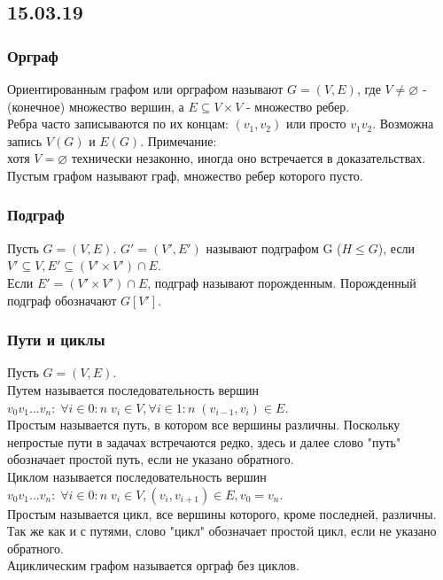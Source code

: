 \subsection{15.03.19}
\subsubsection{Орграф}
Ориентированным графом или орграфом называют $G = (V, E)$, где $V \not= \varnothing$ - (конечное) множество вершин, а $E \subseteq V \times V$ - множество ребер.\\
Ребра часто записываются по их концам: $(v_1, v_2)$ или просто $v_1v_2$.
Возможна запись $V(G)$ и $E(G)$.
Примечание: \\
хотя $V = \varnothing$ технически незаконно, иногда оно встречается в доказательствах.\\
Пустым графом называют граф, множество ребер которого пусто.\\
\subsubsection{Подграф}
Пусть $G = (V, E)$. $G' = (V', E')$ называют подграфом G ($H \leq G$), если $V' \subseteq V, E' \subseteq (V' \times V') \cap E$.\\
Если $E' = (V' \times V') \cap E$, подграф называют порожденным. Порожденный подграф обозначают $G[V']$.\\
\subsubsection{Пути и циклы}
Пусть $G = (V, E)$.\\
Путем называется последовательность вершин $v_0v_1...v_n: \; \forall i \in 0:n \; v_i \in V, \forall i \in 1:n \; (v_{i - 1}, v_i) \in E$.\\
Простым называется путь, в котором все вершины различны. Поскольку непростые пути в задачах встречаются редко, здесь и далее слово "путь" обозначает простой путь, если не указано обратного.\\
Циклом называется последовательность вершин $v_0v_1...v_n: \; \forall i \in 0:n \; v_i \in V, (v_i, v_{i + 1}) \in E, v_0 = v_n$.\\
Простым называется цикл, все вершины которого, кроме последней, различны. Так же как и с путями, слово "цикл" обозначает простой цикл, если не указано обратного.\\
Ациклическим графом называется орграф без циклов.
